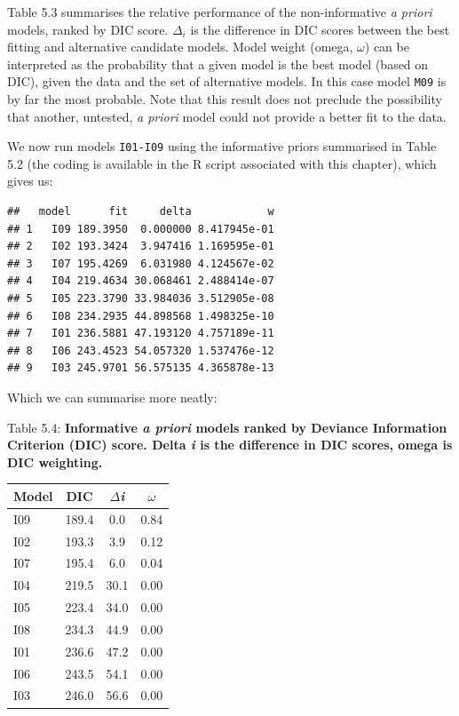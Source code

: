 \documentclass[
]{book}
\begin{document}
Table 5.3 summarises the relative performance of the non-informative \emph{a priori} models, ranked by DIC score. \(\Delta_i\) is the difference in DIC scores between the best fitting and alternative candidate models. Model weight (omega, \(\omega\)) can be interpreted as the probability that a given model is the best model (based on DIC), given the data and the set of alternative models. In this case model \texttt{M09} is by far the most probable. Note that this result does not preclude the possibility that another, untested, \emph{a priori} model could not provide a better fit to the data.

We now run models \texttt{I01-I09} using the informative priors summarised in Table 5.2 (the coding is available in the R script associated with this chapter), which gives us:

\begin{verbatim}
##   model      fit     delta            w
## 1   I09 189.3950  0.000000 8.417945e-01
## 2   I02 193.3424  3.947416 1.169595e-01
## 3   I07 195.4269  6.031980 4.124567e-02
## 4   I04 219.4634 30.068461 2.488414e-07
## 5   I05 223.3790 33.984036 3.512905e-08
## 6   I08 234.2935 44.898568 1.498325e-10
## 7   I01 236.5881 47.193120 4.757189e-11
## 8   I06 243.4523 54.057320 1.537476e-12
## 9   I03 245.9701 56.575135 4.365878e-13
\end{verbatim}

Which we can summarise more neatly:

Table 5.4: \textbf{Informative \emph{a priori} models ranked by Deviance Information Criterion (DIC) score. Delta \emph{i} is the difference in DIC scores, omega is DIC weighting.}

\begin{longtable}[]{@{}lccc@{}}
\toprule
Model & DIC & \(\Delta\)\emph{i} & \(\omega\) \\
\midrule
\endhead
I09 & 189.4 & 0.0 & 0.84 \\
I02 & 193.3 & 3.9 & 0.12 \\
I07 & 195.4 & 6.0 & 0.04 \\
I04 & 219.5 & 30.1 & 0.00 \\
I05 & 223.4 & 34.0 & 0.00 \\
I08 & 234.3 & 44.9 & 0.00 \\
I01 & 236.6 & 47.2 & 0.00 \\
I06 & 243.5 & 54.1 & 0.00 \\
I03 & 246.0 & 56.6 & 0.00 \\
\bottomrule
\end{longtable}
\end{document}

